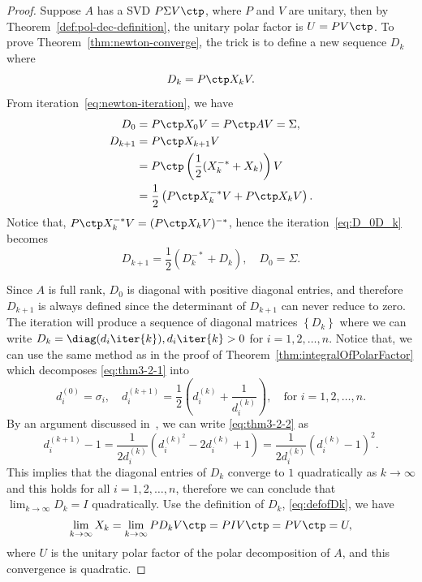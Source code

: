 \documentclass{article}
\numberwithin{equation}{section} %
\begin{document}
\begin{proof}
Suppose $A$ has a SVD $P\Sigma V\ctp$, where $P$ and $V$ are unitary, then
by Theorem~\ref{def:pol-dec-definition}, the unitary polar factor is
$U = PV\ctp$. To prove Theorem~\ref{thm:newton-converge}, the trick is to
define a new sequence $D_k$ where
\begin{equation}
  \label{eq:defofDk} 
  D_k = P\ctp X_k V.
\end{equation} 
From iteration~\eqref{eq:newton-iteration}, we have
\begin{equation}
  \label{eq:D_0D_k}
  \begin{aligned}
    D_0 &= P\ctp X_0 V = P\ctp A V = \Sigma,\\
    D_{k + 1} & = P\ctp X_{k+1} V \\
        & = P\ctp \left(\frac{1}{2} (X_k^{-*} + X_k)\right) V\\
        & = \frac{1}{2} \left(P\ctp X_k^{-*} V + P\ctp X_k V\right).
  \end{aligned}
\end{equation}
Notice that, $P\ctp X_k^{-*}V = (P\ctp X_k V)^{-*}$, hence the
iteration~\eqref{eq:D_0D_k} becomes
\begin{equation}
  \label{eq:thm3-2-1} 
  D_{k + 1} = \frac{1}{2} \left(D_k^{-*} + D_k\right),\quad D_0 = \Sigma.
\end{equation}

Since $A$ is full rank, $D_0$ is diagonal with positive diagonal entries,
and therefore $D_{k + 1}$ is always defined since the determinant of
$D_{k+1}$ can never reduce to zero. The iteration will produce a sequence
of diagonal matrices $\left\{D_k\right\}$ where we can write
$D_k = \diag(d_i\iter{k}), d_i\iter{k} > 0$ for $i = 1,2,\dots,n$. Notice
that, we can use the same method as in the proof of
Theorem~\ref{thm:integralOfPolarFactor} which decomposes
\eqref{eq:thm3-2-1} into
\begin{equation}
  \label{eq:thm3-2-2}
  d_i^{(0)}=\sigma_i, \quad d_i^{(k+1)}=\frac{1}{2}\left(d_i^{(k)}+\frac{1}{d_i^{(k)}}\right),\quad \text{for $i = 1,2,\dots, n.$}
\end{equation}
By an argument discussed in~,
we can write \eqref{eq:thm3-2-2} as
\begin{equation}\label{eq:quadConv}
  d_i^{(k+1)}-1=\frac{1}{2 d_i^{(k)}}\left(d_i^{(k)^2}-2 d_i^{(k)}+1\right)=\frac{1}{2 d_i^{(k)}}\left(d_i^{(k)}-1\right)^2.
\end{equation}
This implies that the diagonal entries of $D_k$ converge to $1$
quadratically as $k\to\infty$ and this holds for all $i = 1,2,\dots, n$,
therefore we can conclude that $\lim_{k\to \infty}D_k = I$ quadratically.
Use the definition of $D_k$, \eqref{eq:defofDk}, we have
\begin{equation}
  \notag
  \lim_{k\to\infty} X_k = \lim_{k\to\infty} PD_kV\ctp = PI V\ctp = PV\ctp = U,
\end{equation}
where $U$ is the unitary polar factor of the polar decomposition of $A$,
and this convergence is quadratic.


\end{proof}
\end{document}
